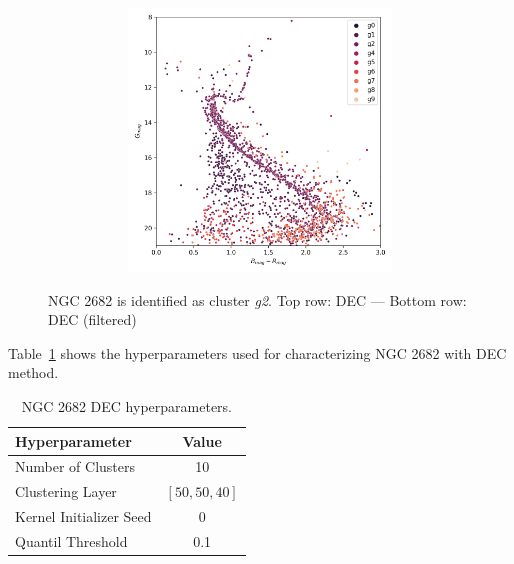 \documentclass[11pt,a4paper,english,twocolumn]{article}
\begin{document}
\begin{figure}[htbp]
\begin{subfigure}{\columnwidth}
\begin{subfigure}[t]{0.30\textwidth}
    \end{subfigure}
    \hfill
    \begin{subfigure}[t]{0.30\textwidth}
      \centering
      \includegraphics[width=\textwidth]{../figures/ngc_2682/dec_hr_diagram_filtered_ngc_2682.png}
    \end{subfigure}
  \end{subfigure}
  \caption{NGC 2682 is identified as cluster \emph{g2}.
           Top row: DEC --- Bottom row: DEC (filtered)}
  \label{fig:app_result_ngc_2682_dec}
\end{figure}

Table~\ref{tab:app_hyperparameters_ngc_2682} shows the
hyperparameters used for characterizing NGC 2682 with DEC method.

\begin{table}[htbp]
  \begin{center}
    \begin{tabular}{l|c}
      \textbf{Hyperparameter} & \textbf{Value} \\
      \hline
      Number of Clusters & 10 \\
      Clustering Layer & \(\left[ 50, 50, 40 \right]\) \\
      Kernel Initializer Seed & 0 \\
      Quantil Threshold & 0.1 \\
    \end{tabular}
    \caption{NGC 2682 DEC hyperparameters.}
    \label{tab:app_hyperparameters_ngc_2682}
  \end{center}
\end{table}
\end{document}
